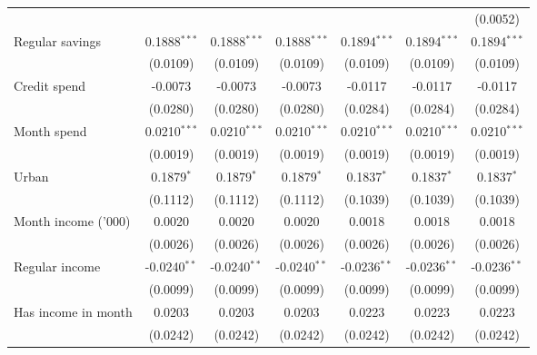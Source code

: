 \begin{table}[htbp]
\begin{footnotesize}
\begin{tabular}{lcccccc}
                                          &                &                &                &                &                & (0.0052)\\
         Regular savings                  & 0.1888$^{***}$ & 0.1888$^{***}$ & 0.1888$^{***}$ & 0.1894$^{***}$ & 0.1894$^{***}$ & 0.1894$^{***}$\\
                                          & (0.0109)       & (0.0109)       & (0.0109)       & (0.0109)       & (0.0109)       & (0.0109)\\
         Credit spend                     & -0.0073        & -0.0073        & -0.0073        & -0.0117        & -0.0117        & -0.0117\\
                                          & (0.0280)       & (0.0280)       & (0.0280)       & (0.0284)       & (0.0284)       & (0.0284)\\
         Month spend                      & 0.0210$^{***}$ & 0.0210$^{***}$ & 0.0210$^{***}$ & 0.0210$^{***}$ & 0.0210$^{***}$ & 0.0210$^{***}$\\
                                          & (0.0019)       & (0.0019)       & (0.0019)       & (0.0019)       & (0.0019)       & (0.0019)\\
         Urban                            & 0.1879$^{*}$   & 0.1879$^{*}$   & 0.1879$^{*}$   & 0.1837$^{*}$   & 0.1837$^{*}$   & 0.1837$^{*}$\\
                                          & (0.1112)       & (0.1112)       & (0.1112)       & (0.1039)       & (0.1039)       & (0.1039)\\
         Month income ('000)              & 0.0020         & 0.0020         & 0.0020         & 0.0018         & 0.0018         & 0.0018\\
                                          & (0.0026)       & (0.0026)       & (0.0026)       & (0.0026)       & (0.0026)       & (0.0026)\\
         Regular income                   & -0.0240$^{**}$ & -0.0240$^{**}$ & -0.0240$^{**}$ & -0.0236$^{**}$ & -0.0236$^{**}$ & -0.0236$^{**}$\\
                                          & (0.0099)       & (0.0099)       & (0.0099)       & (0.0099)       & (0.0099)       & (0.0099)\\
         Has income in month              & 0.0203         & 0.0203         & 0.0203         & 0.0223         & 0.0223         & 0.0223\\
                                          & (0.0242)       & (0.0242)       & (0.0242)       & (0.0242)       & (0.0242)       & (0.0242)\\

\end{tabular}
\end{footnotesize}
\end{table}
